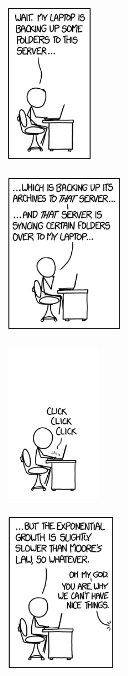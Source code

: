 \begin{figure}
    \centering
    \begin{subfigure}{.2\textwidth}
	    \includegraphics[height=4cm]{bilder/backing_up_1.png}
    \end{subfigure}
    \begin{subfigure}{.2\textwidth}
	    \includegraphics[height=4cm]{bilder/backing_up_2.png}
    \end{subfigure}
    \begin{subfigure}{.2\textwidth}
	    \includegraphics[height=4cm]{bilder/backing_up_3.png}
    \end{subfigure}
    \begin{subfigure}{.2\textwidth}
	    \includegraphics[height=4cm]{bilder/backing_up_4.png}
    \end{subfigure}
\end{figure}

